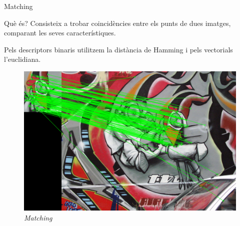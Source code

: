 \documentclass[xcolor=table, 11pt]{beamer}
\newcommand\tz{\fontsize{13}{15.6}\selectfont}
\begin{document}
	\begin{frame}{Matching}
		\tz
		\begin{minipage}{0.62\textwidth}
			\begin{block}{Què és?}
				Consisteix a trobar coincidències entre els punts de dues imatges, comparant les seves característiques.\par
				Pels descriptors binaris utilitzem la distància de Hamming i pels vectorials l'euclidiana.
			\end{block}
		\end{minipage}
		\hfill
		\begin{minipage}{0.36\textwidth}
			\begin{figure}[H]
				\vspace{0.8cm}
				\includegraphics[width=\textwidth]{images/matching}
				\caption{\textit{Matching}}
			\end{figure}
		\end{minipage}
	\end{frame}
\end{document}
